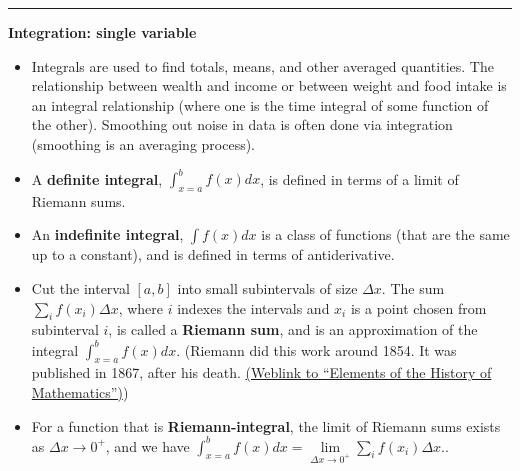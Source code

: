 \documentclass[12pt,letterpaper,noanswers]{exam}
\begin{document}
\vspace{0.5cm}
\hrule
\vspace{0.2cm}

\noindent\textbf{Integration: single variable} 

\begin{tcolorbox}
\begin{itemize}
\itemsep0em
\item  Integrals are used to find totals, means, and other averaged quantities.  The relationship between wealth and income or between weight and food intake is an integral relationship (where one is the time integral of some function of the other).  Smoothing out noise in data is often done via integration (smoothing is an averaging process).
    \item A \textbf{definite integral}, $\int_{x=a}^b f(x)dx$, is defined in terms of a limit of Riemann sums.
    \item An \textbf{indefinite integral}, $\int f(x)dx$ is a class of functions (that are the same up to a constant), and is defined in terms of antiderivative.
    \end{itemize}
    \end{tcolorbox}
    \begin{tcolorbox}
    \begin{itemize}
    \itemsep0em
    \item Cut the interval $[a,b]$ into small subintervals of size $\Delta x$.  The sum $\displaystyle\sum\limits_{i}f(x_{i})\Delta x$, where $i$ indexes the intervals and $x_i$ is a point chosen from subinterval $i$, is called a \textbf{Riemann sum}, and is an approximation of the integral $\displaystyle\int_{x=a}^b f(x) dx$. (Riemann did this work around 1854.  It was published in 1867, after his death. \href{https://books.google.com/books?id=4JprCQAAQBAJ&pg=PA221&dq=riemann+sum+history&hl=en&sa=X&ved=0ahUKEwijlaKLgYbeAhVpk-AKHTHdCUkQ6AEIKTAA#v=onepage&q=riemann%20sum&f=false}{\color{blue}(Weblink to ``Elements of the History of Mathematics'')})
    \item For a function that is \textbf{Riemann-integral}, the limit of Riemann sums exists as $\Delta x \rightarrow 0^+$, and we have $\displaystyle\int_{x=a}^b f(x) dx = \lim\limits_{\Delta x\rightarrow 0^+} \sum\limits_i f(x_i) \Delta x$..
\end{itemize}
\end{tcolorbox}
\end{document}
